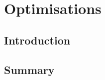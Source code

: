 \chapter{Optimisations} \label{chp:optimisations}
\section{Introduction} \label{sec:optimisations/introduction}

\section{Summary} \label{sec:optimisations/summary}